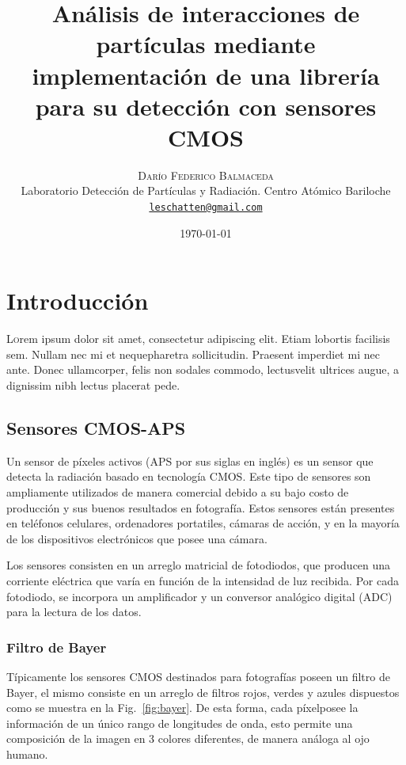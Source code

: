 \documentclass[twoside,twocolumn]{article}
\title{Análisis de interacciones de partículas mediante implementación de una librería para su detección con sensores CMOS}
\author{%
    \textsc{Darío Federico Balmaceda} \\[1ex]     %
    \normalsize Laboratorio Detección de Partículas y Radiación. Centro Atómico Bariloche \\                                    %
    \normalsize \href{mailto:leschatten@gmail.com}{\texttt{leschatten@gmail.com}}                   %
  }
\date{\today}                                                                %
\begin{document}
  
  \maketitle              %
  
  \section{Introducción}\label{sec:intro}
    \lettrine[nindent=0em,lines=3]{L} orem ipsum dolor sit amet, consectetur adipiscing elit.
      Etiam lobortis facilisis sem. Nullam nec mi et nequepharetra sollicitudin.
      Praesent imperdiet mi nec ante. Donec ullamcorper, felis non sodales commodo,
      lectusvelit ultrices augue, a dignissim nibh lectus placerat pede.

    \subsection{Sensores CMOS-APS}\label{sec:intro:CMOS_sensor}
      Un sensor de píxeles activos (APS por sus siglas en inglés) es un sensor que detecta la radiación basado en tecnología CMOS.
      Este tipo de sensores son ampliamente utilizados de manera comercial debido a su
      bajo costo de producción y sus buenos resultados en fotografía.
      Estos sensores están presentes en teléfonos celulares, ordenadores portatiles, cámaras de acción,
      y en la mayoría de los dispositivos electrónicos que posee una cámara.

      Los sensores consisten en un arreglo matricial de fotodiodos, 
      que producen una corriente eléctrica que varía en función de la intensidad de luz recibida.
      Por cada fotodiodo, se incorpora un amplificador y un conversor analógico digital (ADC) para la lectura de los datos.

    \subsubsection{Filtro de Bayer}\label{sec:intro:bayer}

      Típicamente los sensores CMOS destinados para fotografías poseen un filtro de Bayer, 
      el mismo consiste en un arreglo de filtros rojos, verdes y azules dispuestos como se muestra en la Fig.~\ref{fig:bayer}.
      De esta forma, cada píxelposee la información de un único rango de longitudes de onda, 
      esto permite una composición de la imagen en 3 colores diferentes, de manera análoga al ojo humano.
\end{document}
